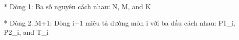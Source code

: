 * Dòng 1: Ba số nguyên cách nhau: N, M, and K  

   * Dòng 2..M+1: Dòng i+1 miêu tả đường mòn i với ba dấu cách nhau: P1\_i, P2\_i, and T\_i